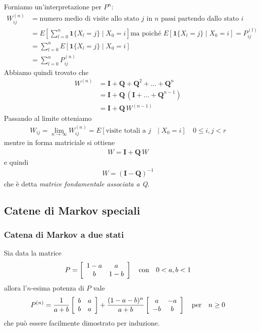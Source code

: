\documentclass{article}
\begin{document}
Forniamo un'interpretazione per $P^n$:
\begin{align*}
W_{ij}^{(n)} &= \text{numero medio di visite allo stato $j$ in $n$ passi partendo dallo stato $i$}\\
&= E\left[\sum_{l=0}^n\textbf{1}\{X_l = j\} \mid X_0 = i\right] \text{ma poiché } E[\textbf{1}\{X_l = j\} \mid X_0 = i] = P_{ij}^{(l)}\\
&= \sum_{l=0}^n E[\mathbf{1}\{X_l = j\} \mid X_0 = i]\\
&= \sum_{l=0}^n P_{ij}^{(n)}
\end{align*}
Abbiamo quindi trovato che
\begin{align*}
W^{(n)} &= \textbf{I} + \textbf{Q} + \textbf{Q}^2 + \hdots + \textbf{Q}^{n}\\
&= \textbf{I} + \textbf{Q}\,(\textbf{I} + \hdots + \textbf{Q}^{n-1})\\
&= \textbf{I} + \textbf{Q}\,W^{(n-1)}
\end{align*}
Passando al limite otteniamo
\begin{align*}
W_{ij} = \lim_{n\to \infty} W_{ij}^{(n)} = E[\text{visite totali a $j$ }\mid X_0= i] \quad 0 \le i,j < r
\end{align*}
mentre in forma matriciale si ottiene
\begin{align*}
W = \textbf{I} + \textbf{Q}\,W
\end{align*}
e quindi
\begin{align}
\label{mc_matrice_fondamentale_Q}
W = (\textbf{I} - \textbf{Q})^{-1}
\end{align}
che è detta \textit{matrice fondamentale associata a Q}.

\subsection{Catene di Markov speciali}

\subsubsection{Catena di Markov a due stati}

Sia data la matrice
\begin{align*}
P = \left[\begin{array}{c c}
1 - a & a\\
b & 1-b
\end{array}\right] \quad \text{con} \quad 0 < a,b < 1
\end{align*}
allora l'$n$-esima potenza di $P$ vale 
\begin{align*}
P^{(n)} = \frac{1}{a+b}\left[\begin{array}{c c}
b & a\\
b & a
\end{array}\right] + \frac{(1 -a - b)^n}{a+b}
\left[\begin{array}{c c}
a &-a\\
-b & b
\end{array}\right] \quad \text{per} \quad n \ge 0
\end{align*}
che può essere facilmente dimostrato per induzione.
\end{document}
